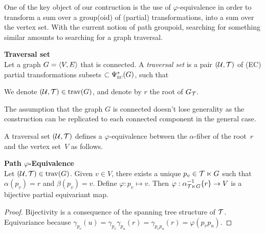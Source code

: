 One of the key object of our contruction is the use of $\varphi$-equivalence in order to transform a sum over a group(oid) of (partial) transformations, into a sum over the vertex set. With the current notion of path groupoid, searching for something similar amounts to searching for a graph traversal.

\begin{definition}\textbf{Traversal set}\\
Let a graph $G = \langle V, E \rangle$ that is connected. A \emph{traversal set} is a pair $(\mathcal{U}, \mathcal{T})$ of (EC) partial transformations subsets $\subset \Psi_{\operatorname{\textsc{ec}}}^*(G)$, such that
We denote $(\mathcal{U}, \mathcal{T}) \in \operatorname{trav}(G)$, and denote by $r$ the root of $G_{\mathcal{T}}$.
\end{definition}

\begin{remark}The assumption that the graph $G$ is connected doesn't lose generality as the construction can be replicated to each connected component in the general case.
\end{remark}

A traversal set $(\mathcal{U}, \mathcal{T})$ defines a $\varphi$-equivalence between the $\alpha$-fiber of the root~$r$ and the vertex set~$V$ as follows.

\begin{lemma}\textbf{Path $\varphi$-Equivalence}\\
Let $(\mathcal{U}, \mathcal{T}) \in \operatorname{trav}(G)$. Given $v \in V$, there exists a unique $p_v \in \mathcal{T} \ltimes G$ such that $\alpha(p_v) = r$ and $\beta(p_v) = v$. Define $\varphi: p_v \mapsto v$. Then $\varphi: \alpha^{-1}_{\mathcal{T} \ltimes G}\{r\} \rightarrow V$ is a bijective partial equivariant map.
\end{lemma}
\begin{proof}
Bijectivity is a consequence of the spanning tree structure of $\mathcal{T}$.
Equivariance because $\gamma_{p_v}(u) = \gamma_{p_v}\gamma_{p_u}(r) = \gamma_{p_vp_u}(r) = \varphi(p_vp_u)$.
\end{proof}

